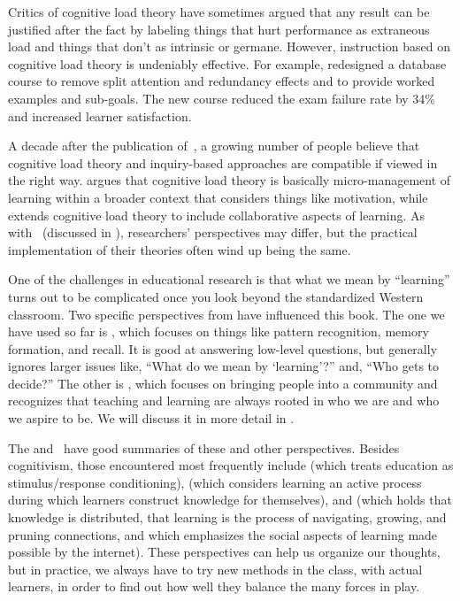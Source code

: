 
Critics of cognitive load theory have sometimes argued that
any result can be justified after the fact by labeling things that hurt performance as extraneous load
and things that don't as intrinsic or germane.
However,
instruction based on cognitive load theory is undeniably effective.
For example,
\cite{Maso2016} redesigned a database course to remove split attention and redundancy effects
and to provide worked examples and sub-goals.
The new course reduced the exam failure rate by 34\%
and increased learner satisfaction.

A decade after the publication of~\cite{Kirs2006},
a growing number of people believe that cognitive load theory and inquiry-based approaches are compatible
if viewed in the right way.
\cite{Kaly2015} argues that cognitive load theory is basically micro-management of learning
within a broader context that considers things like motivation,
while~\cite{Kirs2018} extends cognitive load theory to include collaborative aspects of learning.
As with~\cite{Mark2018} (discussed in ),
researchers' perspectives may differ,
but the practical implementation of their theories often wind up being the same.

One of the challenges in educational research is that
what we mean by ``learning'' turns out to be complicated
once you look beyond the standardized Western classroom.
Two specific perspectives from  have influenced this book.
The one we have used so far is ,
which focuses on things like pattern recognition, memory formation, and recall.
It is good at answering low-level questions,
but generally ignores larger issues like,
``What do we mean by `learning'?''
and, ``Who gets to decide?''
The other is ,
which focuses on bringing people into a community
and recognizes that
teaching and learning are always rooted in who we are and who we aspire to be.
We will discuss it in more detail in .

The 
and~\cite{Wibu2016}
have good summaries of these and other perspectives.
Besides cognitivism,
those encountered most frequently include 
(which treats education as stimulus/response conditioning),
(which considers learning an active process during which learners construct knowledge for themselves),
and 
(which holds that knowledge is distributed,
that learning is the process of navigating, growing, and pruning connections,
and which emphasizes the social aspects of learning made possible by the internet).
These perspectives can help us organize our thoughts,
but in practice,
we always have to try new methods in the class,
with actual learners,
in order to find out how well they balance the many forces in play.

